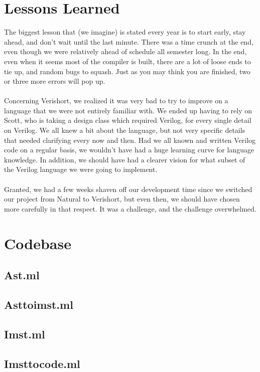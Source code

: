 \documentclass[letterpaper,11pt]{article}
\begin{document}
\section{Lessons Learned}
The biggest lesson that (we imagine) is stated every year is to start early, stay ahead, and 
don't wait until the last minute. There was a time crunch at the end, even though we were 
relatively ahead of schedule all semester long. In the end, even when it seems most of the compiler 
is built, there are a lot of loose ends to tie up, and random bugs to squash. Just as you may think 
you are finished, two or three more errors will pop up.\\\\
Concerning Verishort, we realized it was very bad to try to improve on a language that we were not entirely familiar with. We ended up having to rely on Scott, who is taking a design class which required Verilog, for 
every single detail on Verilog. We all knew a bit about the language, but not very specific details 
that needed clarifying every now and then. Had we all known and written Verilog code on a regular 
basis, we wouldn't have had a huge learning curve for language knowledge.  In addition, we should have had a clearer vision for what subset of the Verilog language we were going to implement.\\\\ 
Granted, we had a few weeks shaven off our development time since we switched our project from Natural 
to Verishort, but even then, we should have chosen more carefully in that respect. It was a challenge, 
and the challenge overwhelmed. 
\newpage
        
\section{Codebase}
\subsection{Ast.ml}

\subsection{Asttoimst.ml}

\subsection{Imst.ml}

\subsection{Imsttocode.ml}

\end{document}
